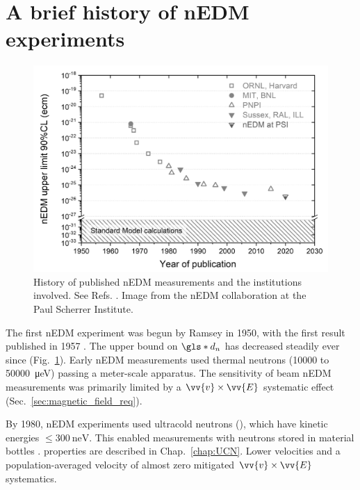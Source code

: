 

\section{A brief history of nEDM experiments}\label{sec:history_nedm}


\begin{figure}[htp]
    \centering
    \includegraphics[width=0.75 \textwidth]{figures/nEDM-history.jpg}
    \caption[History of published nEDM measurements and the institutions involved.]{History of published nEDM measurements and the institutions involved. See Refs. \cite{ramsey_nedm_1950, ramsey_nedm_1957, miller_nedm_1967, baird_nedm_1969, cohen_nedm_1969, dress_nedm_1977, altarev_nedm_1980, altarev_nedm_1981, smith_nedm_1990, BAK06, ABE20}. Image from the nEDM collaboration at the Paul Scherrer Institute.}
    \label{fig:nEDM-history}
\end{figure}

The first nEDM experiment was begun by Ramsey in 1950, with the first result published in 1957 \cite{ramsey_nedm_1950, ramsey_nedm_1957}. The upper bound on $\gls*{d_n}$ has decreased steadily ever since (Fig.~\ref{fig:nEDM-history}). Early nEDM measurements \cite{miller_nedm_1967, baird_nedm_1969, cohen_nedm_1969, dress_nedm_1977} used thermal neutrons (\num{10000} to \qty{50000}{\micro \eV}) passing a meter-scale apparatus. The sensitivity of beam nEDM measurements was primarily limited by a $\vv{v}\times\vv{E}$ systematic effect (Sec.~\ref{sec:magnetic_field_req}).

By 1980, nEDM experiments \cite{altarev_nedm_1980, altarev_nedm_1981} used ultracold neutrons (\ucn), which have kinetic energies $\leq \qty{300}{\nano\eV}$. This enabled measurements with neutrons stored in material bottles \cite{smith_nedm_1990}. \ucn properties are described in Chap.~\ref{chap:UCN}. Lower \ucn velocities and a population-averaged velocity of almost zero mitigated $\vv{v}\times\vv{E}$ systematics. 

